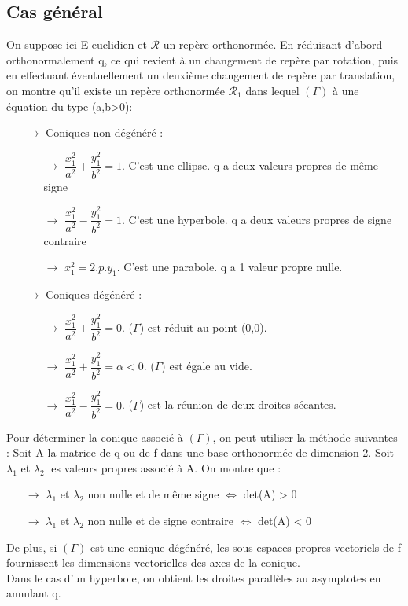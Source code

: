 \subsection{Cas général}
On suppose ici E euclidien et $\mathcal{R}$ un repère orthonormée. En réduisant d'abord orthonormalement q, ce qui revient à un changement de repère par rotation, puis en effectuant éventuellement un deuxième changement de repère par translation, on montre qu'il existe un repère orthonormée $\mathcal{R}_1$ dans lequel $(\Gamma)$ à une équation du type (a,b>0):
\begin{itemize}
 \item[$\rightarrow$] Coniques non dégénéré :
\begin{itemize}
 \item[$\rightarrow$]$\dfrac{x_1^2}{a^2} + \dfrac{y_1^2}{b^2} = 1$. C'est une ellipse. q a deux valeurs propres de même signe
 \item[$\rightarrow$]$\dfrac{x_1^2}{a^2} - \dfrac{y_1^2}{b^2} = 1$. C'est une hyperbole. q a deux valeurs propres de signe contraire
 \item[$\rightarrow$]$x_1^2 = 2.p.y_1$. C'est une parabole. q a 1 valeur propre nulle.
\end{itemize}
 \item[$\rightarrow$] Coniques dégénéré :
\begin{itemize}
 \item[$\rightarrow$] $\dfrac{x_1^2}{a^2} + \dfrac{y_1^2}{b^2} = 0$. ($\Gamma$) est réduit au point (0,0).
 \item[$\rightarrow$] $\dfrac{x_1^2}{a^2} + \dfrac{y_1^2}{b^2} = \alpha < 0$. ($\Gamma$) est égale au vide. 
 \item[$\rightarrow$] $\dfrac{x_1^2}{a^2} - \dfrac{y_1^2}{b^2} = 0$. ($\Gamma$) est la réunion de deux droites sécantes.
\end{itemize}
\end{itemize}
Pour déterminer la conique associé à $(\Gamma)$, on peut utiliser la méthode suivantes : Soit A la matrice de q ou de f dans une base orthonormée de dimension 2. Soit $\lambda_1$ et $\lambda_2$ les valeurs propres associé à A. On montre que :
\begin{itemize}
 \item[$\rightarrow$] $\lambda_1$ et $\lambda_2$ non nulle et de même signe $\Leftrightarrow$ det(A) > 0
 \item[$\rightarrow$] $\lambda_1$ et $\lambda_2$ non nulle et de signe contraire $\Leftrightarrow$ det(A) < 0
\end{itemize}
De plus, si $(\Gamma)$ est une conique dégénéré, les sous espaces propres vectoriels de f fournissent les dimensions vectorielles des axes de la conique.\\
Dans le cas d'un hyperbole, on obtient les droites parallèles au asymptotes en annulant q.
